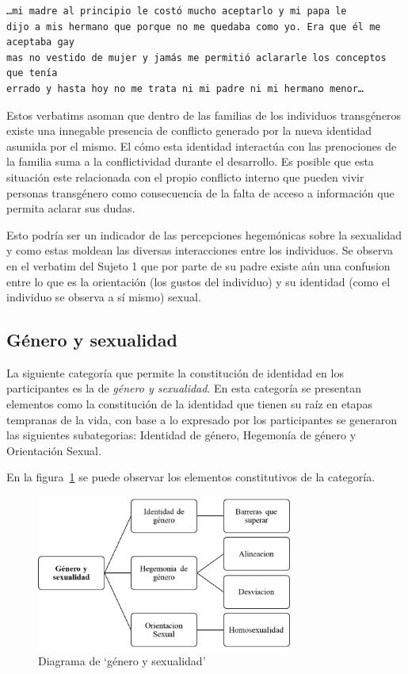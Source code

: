 \begin{verbatim}
…mi madre al principio le costó mucho aceptarlo y mi papa le
dijo a mis hermano que porque no me quedaba como yo. Era que él me aceptaba gay
mas no vestido de mujer y jamás me permitió aclararle los conceptos que tenía
errado y hasta hoy no me trata ni mi padre ni mi hermano menor…
\end{verbatim}

Estos verbatims asoman que dentro de las familias de los individuos transgéneros
existe una innegable presencia de conflicto generado por la nueva identidad
asumida por el mismo. El cómo esta identidad interactúa con las prenociones de
la familia suma a la conflictividad durante el desarrollo. Es posible que esta
situación este relacionada con el propio conflicto interno que pueden vivir
personas transgénero como consecuencia de la falta de acceso a información que
permita aclarar sus dudas.

Esto podría ser un indicador de las percepciones hegemónicas sobre la sexualidad
y como estas moldean las diversas interacciones entre los individuos. Se
observa en el verbatim del Sujeto 1 que por parte de su padre existe aún una
confusion entre lo que es la orientación (los gustos del individuo) y su
identidad (como el individuo se observa a sí mismo) sexual.

\subsection{Género y sexualidad}

La siguiente categoría que permite la constitución de identidad en los
participantes es la de \emph{género y sexualidad}. En esta categoría se
presentan elementos como la constitución de la identidad que tienen su raíz en
etapas tempranas de la vida, con base a lo expresado por los participantes se
generaron las siguientes subategorias: Identidad de género, Hegemonía de género
y Orientación Sexual.

En la figura~\ref{fig:genero} se puede observar los elementos constitutivos de
la categoría.

\begin{figure}
    \centering
    \includegraphics[width=0.75\textwidth]{genero}
    \caption{Diagrama de ‘género y sexualidad’}\label{fig:genero}
\end{figure}


